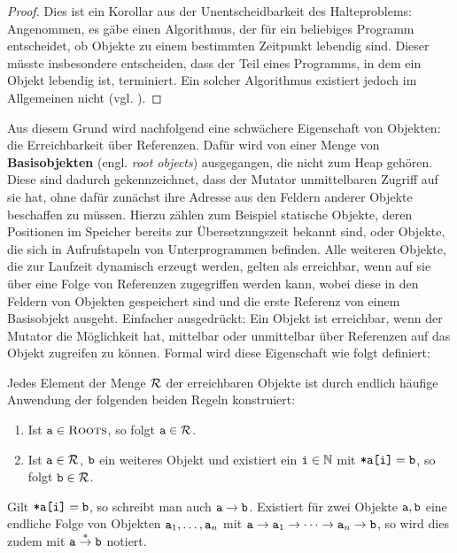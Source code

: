 \begin{proof}
	Dies ist ein Korollar aus der Unentscheidbarkeit des Halteproblems:
	Angenommen, es gäbe einen Algorithmus, der für ein beliebiges Programm entscheidet, ob Objekte zu einem bestimmten Zeitpunkt lebendig sind.
	Dieser müsste insbesondere entscheiden, dass der Teil eines Programms, in dem ein Objekt lebendig ist, terminiert.
	Ein solcher Algorithmus existiert jedoch im Allgemeinen nicht (vgl. \cite[Kap. 4.2]{sipser}).
\end{proof}

Aus diesem Grund wird nachfolgend eine schwächere Eigenschaft von Objekten: die Erreichbarkeit über Referenzen.
Dafür wird von einer Menge \Roots von \textbf{Basisobjekten} (engl. \textit{root objects}) ausgegangen, die nicht zum Heap gehören.
Diese sind dadurch gekennzeichnet, dass der Mutator unmittelbaren Zugriff auf sie hat, ohne dafür zunächst ihre Adresse aus den Feldern anderer Objekte beschaffen zu müssen.
Hierzu zählen zum Beispiel statische Objekte, deren Positionen im Speicher bereits zur Übersetzungszeit bekannt sind, oder Objekte, die sich in Aufrufstapeln von Unterprogrammen befinden.
Alle weiteren Objekte, die zur Laufzeit dynamisch erzeugt werden, gelten als erreichbar, wenn auf sie über eine Folge von Referenzen zugegriffen werden kann, wobei diese in den Feldern von Objekten gespeichert sind und die erste Referenz von einem Basisobjekt ausgeht.
Einfacher ausgedrückt: Ein Objekt ist erreichbar, wenn der Mutator die Möglichkeit hat, mittelbar oder unmittelbar über Referenzen auf das Objekt zugreifen zu können.
Formal wird diese Eigenschaft wie folgt definiert:

\begin{mybox}
\begin{defn}[Erreichbarkeit]
	\label{def:erreichbar}
	Jedes Element der Menge $\mathcal{R}$ der erreichbaren Objekte ist durch endlich häufige Anwendung der folgenden beiden Regeln konstruiert:
	\begin{enumerate}[(1)]
		\item Ist $\texttt{a} \in \textsc{Roots}$, so folgt $\texttt{a} \in \mathcal{R}$.
		\item Ist $\texttt{a} \in \mathcal{R}$, $\texttt{b}$ ein weiteres Objekt und existiert ein $\texttt{i} \in \mathbb{N}$ mit $\texttt{*a[i]} = \texttt{b}$, so folgt $\texttt{b} \in \mathcal{R}$.
	\end{enumerate}
	Gilt $\texttt{*a[i]} = \texttt{b}$, so schreibt man auch $\texttt{a} \rightarrow \texttt{b}$.
	Existiert für zwei Objekte $\texttt{a}, \texttt{b}$ eine endliche Folge von Objekten $\texttt{a}_1, \dots, \texttt{a}_n$ mit $\texttt{a} \rightarrow \texttt{a}_1 \rightarrow \dots \rightarrow \texttt{a}_n \rightarrow \texttt{b}$, so wird dies zudem mit $\texttt{a} \overset{*}{\rightarrow} \texttt{b}$ notiert.
\end{defn}
\end{mybox}

